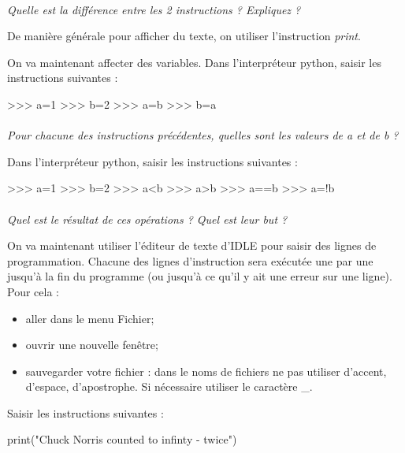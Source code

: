 \documentclass[11pt,oneside]{article}
\begin{document}
\paragraph{}
\textit{Quelle est la différence entre les 2 instructions ? Expliquez ?}

De manière générale pour afficher du texte, on utiliser l'instruction \textsl{print}.

On va maintenant affecter des variables. Dans l'interpréteur python, saisir les instructions suivantes :

\begin{py}
\begin{python}
>>> a=1
>>> b=2
>>> a=b
>>> b=a
\end{python}
\end{py}

\paragraph{} 
\textit{Pour chacune des instructions précédentes, quelles sont les valeurs de a et de b ?}


Dans l'interpréteur python, saisir les instructions suivantes :
\begin{py}
\begin{python}
>>> a=1
>>> b=2
>>> a<b
>>> a>b
>>> a==b
>>> a=!b
\end{python}
\end{py}


\paragraph{} 
\textit{Quel est le résultat de ces opérations ? Quel est leur but ?}


On va maintenant utiliser l'éditeur de texte d'IDLE pour saisir des lignes de programmation. Chacune des lignes d'instruction sera exécutée une par une jusqu'à la fin du programme (ou jusqu'à ce qu'il y ait une erreur sur une ligne). Pour cela :
\begin{itemize}
\item aller dans le menu Fichier;
\item ouvrir une nouvelle fenêtre;
\item sauvegarder votre fichier : dans le noms de fichiers ne pas utiliser d'accent, d'espace, d'apostrophe. Si nécessaire utiliser le caractère \_.
\end{itemize}

Saisir les instructions suivantes :
\begin{py}
\begin{python}
print("Chuck Norris counted to infinty - twice")
\end{python}
\end{py}
\end{document}
